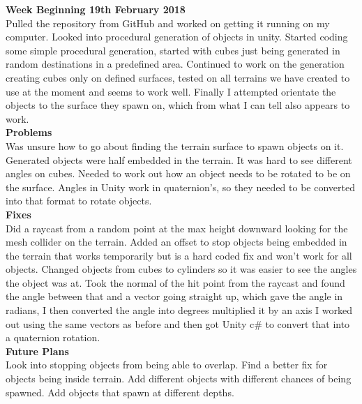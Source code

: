 \documentclass[10pt, a4paper]{article}
\begin{document}
	\textbf{Week Beginning 19th February 2018}\\
	Pulled the repository from GitHub and worked on getting it running on my computer. Looked into
	procedural generation of objects in unity. Started coding some simple procedural generation, started
	with cubes just being generated in random destinations in a predefined area. Continued to work on
	the generation creating cubes only on defined surfaces, tested on all terrains we have created to use
	at the moment and seems to work well. Finally I attempted orientate the objects to the surface they
	spawn on, which from what I can tell also appears to work.\\
	\textbf{Problems}\\
	Was unsure how to go about finding the terrain surface to spawn objects on it. Generated objects
	were half embedded in the terrain. It was hard to see different angles on cubes. Needed to work out
	how an object needs to be rotated to be on the surface. Angles in Unity work in quaternion's, so
	they needed to be converted into that format to rotate objects.\\
	\textbf{Fixes}\\
	Did a raycast from a random point at the max height downward looking for the mesh collider on the
	terrain. Added an offset to stop objects being embedded in the terrain that works temporarily but is
	a hard coded fix and won't work for all objects. Changed objects from cubes to cylinders so it was
	easier to see the angles the object was at. Took the normal of the hit point from the raycast and
	found the angle between that and a vector going straight up, which gave the angle in radians, I then
	converted the angle into degrees multiplied it by an axis I worked out using the same vectors as
	before and then got Unity c\# to convert that into a quaternion rotation.\\
	\textbf{Future Plans}\\
	Look into stopping objects from being able to overlap. Find a better fix for objects being inside
	terrain. Add different objects with different chances of being spawned. Add objects that spawn at
	different depths.\\\\
	
\end{document}
